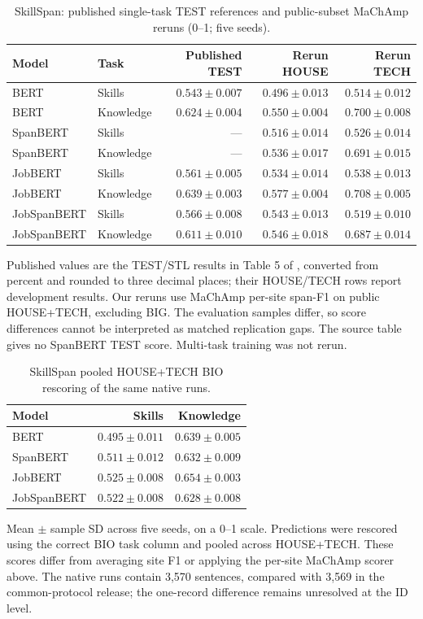 \begin{table}[H]
\centering\small
\caption{SkillSpan: published single-task TEST references and public-subset MaChAmp reruns (0--1; five seeds).}
\label{tab:external-native}
\begin{tabularx}{\linewidth}{@{}L P{.15\linewidth}rrr@{}}
\toprule
Model & Task & Published TEST & Rerun HOUSE & Rerun TECH \\
\midrule
BERT & Skills & $0.543\pm0.007$ & $0.496\pm0.013$ & $0.514\pm0.012$ \\
BERT & Knowledge & $0.624\pm0.004$ & $0.550\pm0.004$ & $0.700\pm0.008$ \\
SpanBERT & Skills & --- & $0.516\pm0.014$ & $0.526\pm0.014$ \\
SpanBERT & Knowledge & --- & $0.536\pm0.017$ & $0.691\pm0.015$ \\
JobBERT & Skills & $0.561\pm0.005$ & $0.534\pm0.014$ & $0.538\pm0.013$ \\
JobBERT & Knowledge & $0.639\pm0.003$ & $0.577\pm0.004$ & $0.708\pm0.005$ \\
JobSpanBERT & Skills & $0.566\pm0.008$ & $0.543\pm0.013$ & $0.519\pm0.010$ \\
JobSpanBERT & Knowledge & $0.611\pm0.010$ & $0.546\pm0.018$ & $0.687\pm0.014$ \\
\bottomrule
\end{tabularx}
\par\smallskip\RaggedRight\footnotesize Published values are the TEST/STL results in Table 5 of \citet{zhang2022skillspan}, converted from percent and rounded to three decimal places; their HOUSE/TECH rows report development results. Our reruns use MaChAmp per-site span-F1 on public HOUSE+TECH, excluding BIG. The evaluation samples differ, so score differences cannot be interpreted as matched replication gaps. The source table gives no SpanBERT TEST score. Multi-task training was not rerun.
\end{table}

\begin{table}[H]
\centering\small
\caption{SkillSpan pooled HOUSE+TECH BIO rescoring of the same native runs.}
\label{tab:external-native-pooled}
\begin{tabularx}{\linewidth}{@{}Lrr@{}}
\toprule
Model & Skills & Knowledge \\
\midrule
BERT & $0.495\pm0.011$ & $0.639\pm0.005$ \\
SpanBERT & $0.511\pm0.012$ & $0.632\pm0.009$ \\
JobBERT & $0.525\pm0.008$ & $0.654\pm0.003$ \\
JobSpanBERT & $0.522\pm0.008$ & $0.628\pm0.008$ \\
\bottomrule
\end{tabularx}
\par\smallskip\RaggedRight\footnotesize Mean $\pm$ sample SD across five seeds, on a 0--1 scale. Predictions were rescored using the correct BIO task column and pooled across HOUSE+TECH. These scores differ from averaging site F1 or applying the per-site MaChAmp scorer above. The native runs contain 3,570 sentences, compared with 3,569 in the common-protocol release; the one-record difference remains unresolved at the ID level.
\end{table}

